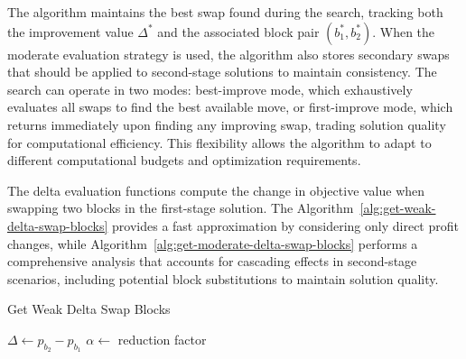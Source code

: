 The algorithm maintains the best swap found during the search, tracking both the improvement value $\Delta^*$ and the associated block pair $(b_1^*, b_2^*)$. When the moderate evaluation strategy is used, the algorithm also stores secondary swaps that should be applied to second-stage solutions to maintain consistency. The search can operate in two modes: best-improve mode, which exhaustively evaluates all swaps to find the best available move, or first-improve mode, which returns immediately upon finding any improving swap, trading solution quality for computational efficiency. This flexibility allows the algorithm to adapt to different computational budgets and optimization requirements.

The delta evaluation functions compute the change in objective value when swapping two blocks in the first-stage solution. The Algorithm~\ref{alg:get-weak-delta-swap-blocks} provides a fast approximation by considering only direct profit changes, while Algorithm~\ref{alg:get-moderate-delta-swap-blocks} performs a comprehensive analysis that accounts for cascading effects in second-stage scenarios, including potential block substitutions to maintain solution quality.

\begin{algorithm}[h!]
	\caption{Get Weak Delta Swap Blocks} \label{alg:get-weak-delta-swap-blocks}
	\SetAlgoLined

	$\Delta \leftarrow p_{b_2} - p_{b_1}$\;
	$\alpha \leftarrow$ reduction factor\;

	\Return{$\Delta$}\;
\end{algorithm}

